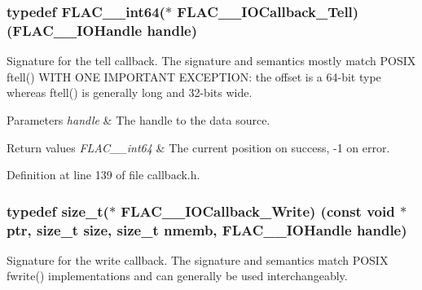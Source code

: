 \subsubsection[{\texorpdfstring{F\+L\+A\+C\+\_\+\+\_\+\+I\+O\+Callback\+\_\+\+Tell}{FLAC__IOCallback_Tell}}]{\setlength{\rightskip}{0pt plus 5cm}typedef {\bf F\+L\+A\+C\+\_\+\+\_\+int64}($\ast$ F\+L\+A\+C\+\_\+\+\_\+\+I\+O\+Callback\+\_\+\+Tell) ({\bf F\+L\+A\+C\+\_\+\+\_\+\+I\+O\+Handle} handle)}\hypertarget{group__flac__callbacks_ga45314930cabc2e9c04867eae6bca309f}{}\label{group__flac__callbacks_ga45314930cabc2e9c04867eae6bca309f}
Signature for the tell callback. The signature and semantics mostly match P\+O\+S\+IX ftell() W\+I\+TH O\+NE I\+M\+P\+O\+R\+T\+A\+NT E\+X\+C\+E\+P\+T\+I\+ON\+: the offset is a 64-\/bit type whereas ftell() is generally \textquotesingle{}long\textquotesingle{} and 32-\/bits wide.


\begin{DoxyParams}{Parameters}
{\em handle} & The handle to the data source. \\
\hline
\end{DoxyParams}

\begin{DoxyRetVals}{Return values}
{\em F\+L\+A\+C\+\_\+\+\_\+int64} & The current position on success, {\ttfamily -\/1} on error. \\
\hline
\end{DoxyRetVals}


Definition at line 139 of file callback.\+h.

\subsubsection[{\texorpdfstring{F\+L\+A\+C\+\_\+\+\_\+\+I\+O\+Callback\+\_\+\+Write}{FLAC__IOCallback_Write}}]{\setlength{\rightskip}{0pt plus 5cm}typedef size\+\_\+t($\ast$ F\+L\+A\+C\+\_\+\+\_\+\+I\+O\+Callback\+\_\+\+Write) ({\bf const} {\bf void} $\ast$ptr, size\+\_\+t {\bf size}, size\+\_\+t {\bf nmemb}, {\bf F\+L\+A\+C\+\_\+\+\_\+\+I\+O\+Handle} handle)}\hypertarget{group__flac__callbacks_gad991792235879aecae289b56a112e1b8}{}\label{group__flac__callbacks_gad991792235879aecae289b56a112e1b8}
Signature for the write callback. The signature and semantics match P\+O\+S\+IX fwrite() implementations and can generally be used interchangeably.


